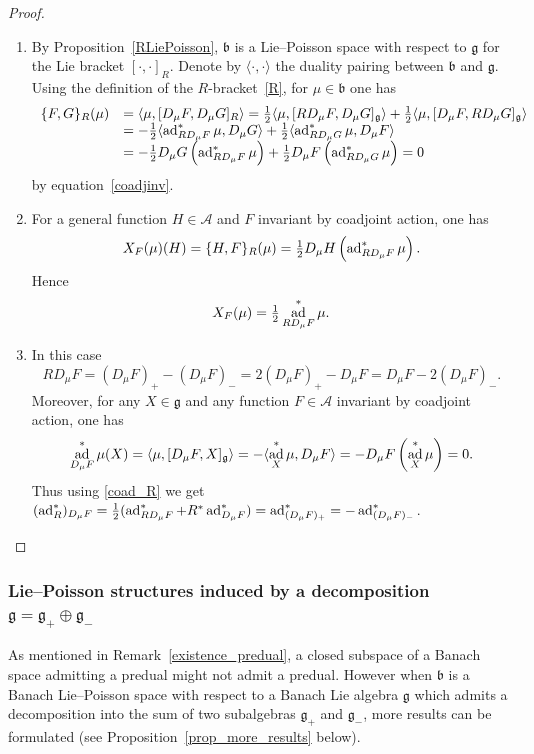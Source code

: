 \documentclass[a4paper,12pt,reqno]{amsart}%
\theoremstyle{definition}
\theoremstyle{remark}
\numberwithin{theorem}{section}
\numberwithin{equation}{section}
\newcommand{\1}{{\bf 1}}
\DeclareMathOperator{\ad}{\textnormal{ad}}
\newcommand{\g}{{\mathfrak g}}
\newcommand{\bg}{{\mathfrak b}}
\begin{document}
\begin{proof}$\;$
\begin{enumerate} \item
    By Proposition~\ref{RLiePoisson}, $\bg$ is a Lie--Poisson space with respect to $\g$ for the Lie bracket $[\cdot, \cdot]_R$. Denote by $\langle\cdot, \cdot\rangle$ the duality pairing between $\bg$ and $\g$. Using the definition of the $R$-bracket~\eqref{R}, for $\mu \in \bg$ one has
    \[
    \begin{array}{ll}
    \{F,G\}_R(\mu) &= \langle \mu, [D_\mu F, D_\mu G]_R\rangle = \frac{1}{2} \langle \mu, [R D_\mu F, D_\mu G]_{\g}\rangle + \frac{1}{2} \langle \mu, [ D_\mu F, R D_\mu G]_{\g}\rangle\\
    & = -\frac{1}{2} \langle \ad^*_{R D_\mu F}\mu, D_\mu G\rangle + \frac{1}{2} \langle  \ad^*_{R D_\mu G}\mu, D_\mu F\rangle\\
    & = -\frac{1}{2}  D_\mu G\left(\ad^*_{R D_\mu F}\mu\right) + \frac{1}{2} D_\mu F\left(\ad^*_{R D_\mu G}\mu\right) = 0
    \end{array}
    \]
    by equation~\eqref{coadjinv}.
    \item For a general function $H\in \mathcal{A}$ and $F$ invariant by coadjoint action, one has
    \[
    \begin{array}{ll}
    X_F(\mu)(H) = \{H,F\}_R(\mu) = \frac{1}{2}  D_\mu H\left(\ad^*_{R D_\mu F}\mu\right).
    \end{array}
    \]
    Hence \[X_F(\mu) = \tfrac12 \ad^*_{R D_\mu F }\mu.\]
   

\item In this case 
\[
R D_\mu F = (D_\mu F)_+ - (D_\mu F)_- =  2(D_\mu F)_+ - D_\mu F = D_\mu F - 2(D_\mu F)_-.
\]
Moreover, for any $X\in \g$ and any function $F\in \mathcal A$ invariant by coadjoint action, one has
\[
    \ad^*_{D_\mu F}\mu (X) = \langle \mu, [D_\mu F, X]_\g\rangle = -\langle \ad^*_X \mu, D_\mu F\rangle = - D_\mu F\left(\ad^*_X \mu\right) = 0.
\]
Thus using \eqref{coad_R} we get $(\ad^*_R)_{D_\mu F} = \frac12 (\ad^*_{R D_\mu F} + R^*\ad^*_{D_\mu F}) = \ad^*_{(D_\mu F)_+} = - \ad^*_{(D_\mu F)_-}$. 
 \end{enumerate}
\end{proof}


\subsubsection{Lie--Poisson structures induced by a decomposition $\g = \g_+\oplus \g_-$}\label{subalgebras}
As mentioned in Remark~\ref{existence_predual}, a closed subspace of a Banach space admitting a predual might not admit a predual. However when $\bg$ is a Banach Lie--Poisson space with respect to a Banach Lie algebra $\g$ which admits a decomposition into the sum of two subalgebras $\g_+$ and $\g_-$, more results can be formulated (see Proposition~\ref{prop_more_results} below).
\end{document}
